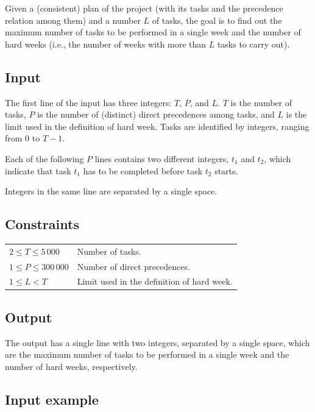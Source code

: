 \documentclass[11pt]{report}
\begin{document}
Given a (consistent) plan of the project
(with its tasks and the precedence relation among them) and
a number $L$ of tasks,
the goal is to find out
the maximum number of tasks to be performed in a single week and
the number of hard weeks
(i.e., the number of weeks with more than $L$ tasks to carry out).


\subsection*{Input}

The first line of the input has three integers: $T$, $P$, and $L$.
$T$ is the number of tasks,
$P$ is the number of (distinct) direct precedences among tasks, and
$L$ is the limit used in the definition of hard week.
Tasks are identified by integers, ranging from $0$ to $T-1$.

Each of the following $P$ lines contains two different integers,
$t_1$ and $t_2$,
which indicate that task $t_1$ has to be completed before task $t_2$ starts.

Integers in the same line are separated by a single space.


\subsection*{Constraints}

\begin{tabular}{ll}
$2 \leq T \leq  5\,000$ & Number of tasks.              \\
$1 \leq P \leq 300\,000$ & Number of direct precedences. \\
$1 \leq L < T$ & Limit used in the definition of hard week.
\end{tabular}


\subsection*{Output}

The output has a single line with two integers,
separated by a single space,
which are
the maximum number of tasks to be performed in a single week and
the number of hard weeks, respectively.



\subsection*{Input example}
\end{document}
